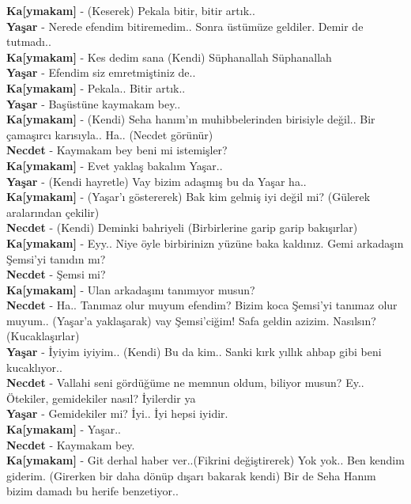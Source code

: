 \documentclass[]{book}
\begin{document}
\textbf{Ka{[}ymakam{]}} - (Keserek) Pekala bitir, bitir artık..\\
\textbf{Yaşar} - Nerede efendim bitiremedim.. Sonra üstümüze geldiler. Demir de tutmadı..\\
\textbf{Ka{[}ymakam{]}} - Kes dedim sana (Kendi) Süphanallah Süphanallah\\
\textbf{Yaşar} - Efendim siz emretmiştiniz de..\\
\textbf{Ka{[}ymakam{]}} - Pekala.. Bitir artık..\\
\textbf{Yaşar} - Başüstüne kaymakam bey..\\
\textbf{Ka{[}ymakam{]}} - (Kendi) Seha hanım'ın muhibbelerinden birisiyle değil.. Bir çamaşırcı karısıyla..
Ha.. (Necdet görünür)\\
\textbf{Necdet} - Kaymakam bey beni mi istemişler?\\
\textbf{Ka{[}ymakam{]}} - Evet yaklaş bakalım Yaşar..\\
\textbf{Yaşar} - (Kendi hayretle) Vay bizim adaşmış bu da Yaşar ha..\\
\textbf{Ka{[}ymakam{]}} - (Yaşar'ı göstererek) Bak kim gelmiş iyi değil mi? (Gülerek aralarından çekilir)\\
\textbf{Necdet} - (Kendi) Deminki bahriyeli (Birbirlerine garip garip bakışırlar)\\
\textbf{Ka{[}ymakam{]}} - Eyy.. Niye öyle birbirinizn yüzüne baka kaldınız. Gemi arkadaşın Şemsi'yi tanıdın mı?\\
\textbf{Necdet} - Şemsi mi?\\
\textbf{Ka{[}ymakam{]}} - Ulan arkadaşını tanımıyor musun?\\
\textbf{Necdet} - Ha.. Tanımaz olur muyum efendim? Bizim koca Şemsi'yi tanımaz olur muyum.. (Yaşar'a yaklaşarak) vay Şemsi'ciğim! Safa geldin azizim. Nasılsın? (Kucaklaşırlar)\\
\textbf{Yaşar} - İyiyim iyiyim.. (Kendi) Bu da kim.. Sanki kırk yıllık ahbap gibi beni kucaklıyor..\\
\textbf{Necdet} - Vallahi seni gördüğüme ne memnun oldum, biliyor musun? Ey.. Ötekiler, gemidekiler nasıl? İyilerdir ya\\
\textbf{Yaşar} - Gemidekiler mi? İyi.. İyi hepsi iyidir.\\
\textbf{Ka{[}ymakam{]}} - Yaşar..\\
\textbf{Necdet} - Kaymakam bey.\\
\textbf{Ka{[}ymakam{]}} - Git derhal haber ver..(Fikrini değiştirerek) Yok yok.. Ben kendim giderim. (Girerken bir daha dönüp dışarı bakarak kendi) Bir de Seha Hanım bizim damadı bu herife benzetiyor..\\
\end{document}
